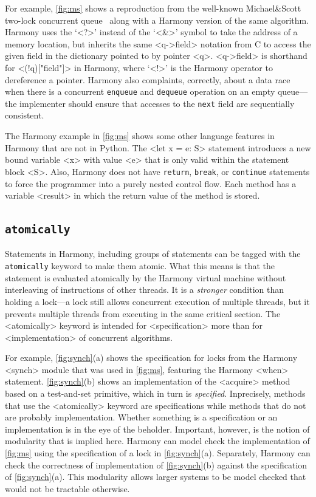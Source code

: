\documentclass[twocolumn]{article}
\begin{document}
For example, \autoref{fig:ms} shows a reproduction from the well-known
Michael\&Scott two-lock concurrent queue~\cite{MS96} along with a
Harmony version of the same algorithm.
Harmony uses the `<{?}>' instead of the `<{&}>' symbol to take the address
of a memory location, but inherits the same <{q->field}> notation
from C to access the given field in the dictionary pointed to by
pointer <{q}>.  <{q->field}> is shorthand for <{(!q)["field"]}> in
Harmony, where `<{!}>' is the Harmony operator to dereference a pointer.
Harmony also complaints, correctly, about a data race when
there is a concurrent \texttt{enqueue} and \texttt{dequeue} operation
on an empty queue---the implementer should ensure that accesses to the
\texttt{next} field are sequentially consistent.

The Harmony example in \autoref{fig:ms} shows some other language
features in Harmony that are not in Python.
The <{let x = e: S}> statement introduces a new bound variable <{x}>
with value <{e}> that is only valid within the statement block <{S}>.
Also, Harmony does not have \texttt{return}, \texttt{break}, or
\texttt{continue} statements to force the programmer into a purely
nested control flow.  Each method has a variable <{result}> in which
the return value of the method is stored.

\subsection{\texttt{atomically}}

Statements in Harmony, including groups of statements can be tagged with
the \texttt{atomically} keyword to make them atomic.  What this means
is that the statement is evaluated atomically by the Harmony virtual
machine without interleaving of instructions of other threads.  It is
a \emph{stronger} condition than holding a lock---a lock still allows
concurrent execution of multiple threads, but it prevents multiple
threads from executing in the same critical section.
The <{atomically}> keyword is intended for <{specification}> more than
for <{implementation}> of concurrent algorithms.

For example, \autoref{fig:synch}(a) shows the specification for locks
from the Harmony <{synch}> module that was used in \autoref{fig:ms},
featuring the Harmony <{when}> statement.
\autoref{fig:synch}(b) shows an implementation of the <{acquire}>
method based on a test-and-set primitive, which in turn is
\emph{specified}.
Inprecisely, methods that use the <{atomically}> keyword are specifications
while methods that do not are probably implementation.
Whether something is a specification or an implementation is in the
eye of the beholder.
Important, however, is the notion of modularity that is implied here.
Harmony can model check the implementation of \autoref{fig:ms} using
the specification of a lock in \autoref{fig:synch}(a).
Separately, Harmony can check the correctness of implementation of
\autoref{fig:synch}(b) against the specification of
\autoref{fig:synch}(a).  This modularity allows larger systems to
be model checked that would not be tractable otherwise.
\end{document}
